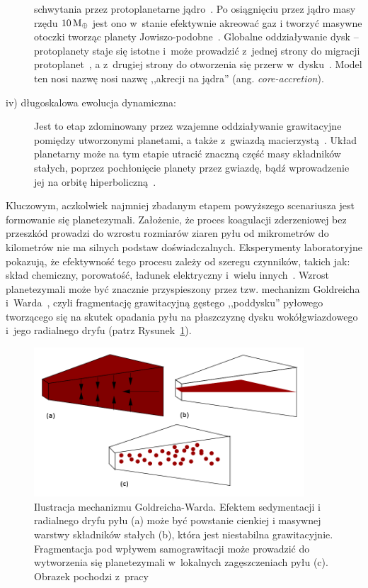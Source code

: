 \begin{description}
   schwytania przez protoplanetarne jądro~\cite{II03}. Po osiągnięciu przez
   jądro masy rzędu $10\hbox{$\mathrm{\thinspace M_{\oplus}}$}$ jest ono w~stanie efektywnie akreować gaz i
   tworzyć masywne otoczki tworząc planety Jowiszo-podobne~\cite{Petal96}.
   Globalne oddziaływanie dysk -- protoplanety staje się istotne i~może
   prowadzić z~jednej strony do migracji protoplanet~\cite{Papa07}, a z~drugiej
   strony do otworzenia się przerw w~dysku~\citep{KKI06}. Model ten nosi nazwę
   nosi nazwę ,,akrecji na jądra'' (ang. \emph{core-accretion}). 
%
\item[iv) długoskalowa ewolucja dynamiczna:]
   Jest to etap zdominowany przez wzajemne oddziaływanie
   grawitacyjne pomiędzy utworzonymi planetami, a także z~gwiazdą
   macierzystą~\cite{CW98}.  Układ planetarny może na tym etapie utracić
   znaczną część masy składników stałych, poprzez pochłonięcie planety przez
   gwiazdę, bądź wprowadzenie jej na orbitę hiperboliczną~\cite{DAA13}.
%
\end{description}
Kluczowym, aczkolwiek najmniej zbadanym etapem powyższego scenariusza jest
formowanie się planetezymali. Założenie, że proces koagulacji zderzeniowej bez
przeszkód prowadzi do wzrostu rozmiarów ziaren pyłu od mikrometrów do kilometrów
nie ma silnych podstaw doświadczalnych. Eksperymenty laboratoryjne pokazują, że
efektywność tego procesu zależy od szeregu czynników, takich jak: skład
chemiczny, porowatość, ładunek elektryczny i~wielu innych~\cite{SBT97, GBZ10}.
Wzrost planetezymali może być znacznie przyspieszony przez tzw. mechanizm
Goldreicha i~Warda~\cite{GW73}, czyli fragmentację grawitacyjną gęstego
,,poddysku'' pyłowego tworzącego się na skutek opadania pyłu na płaszczyznę
dysku wokółgwiazdowego i~jego radialnego dryfu (patrz Rysunek~\ref{fig:GW}).

\begin{figure}[h]
   \centering
   \includegraphics[width=0.9\textwidth]{figures/sedymentacja.png}
   \caption{Ilustracja mechanizmu Goldreicha-Warda. Efektem sedymentacji i
      radialnego dryfu pyłu (a) może być powstanie cienkiej i masywnej warstwy
      składników stałych (b), która jest niestabilna grawitacyjnie.
      Fragmentacja pod wpływem samograwitacji może
      prowadzić do wytworzenia się planetezymali w~lokalnych zagęszczeniach pyłu
      (c). Obrazek pochodzi z~pracy~\cite{armitage}
   }
   \label{fig:GW}
\end{figure}

